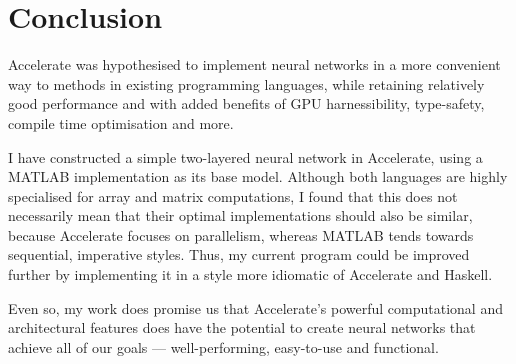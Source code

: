 \chapter{Conclusion}\label{ch:conclusion}

Accelerate was hypothesised to implement neural networks in a more convenient way to methods in existing programming languages, while retaining relatively good performance and with added benefits of GPU harnessibility, type-safety, compile time optimisation and more.

I have constructed a simple two-layered neural network in Accelerate, using a MATLAB implementation as its base model. Although both languages are highly specialised for array and matrix computations, I found that this does not necessarily mean that their optimal implementations should also be similar, because Accelerate focuses on parallelism, whereas MATLAB tends towards sequential, imperative styles. Thus, my current program could be improved further by implementing it in a style more idiomatic of Accelerate and Haskell. 

Even so, my work does promise us that Accelerate's powerful computational and architectural features does have the potential to create neural networks that achieve all of our goals --- well-performing, easy-to-use and functional.

